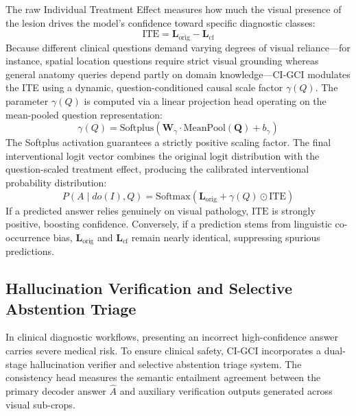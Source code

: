\documentclass[journal]{IEEEtran}
\begin{document}
The raw Individual Treatment Effect measures how much the visual presence of the lesion drives the model's confidence toward specific diagnostic classes:
\begin{equation}
\text{ITE} = \mathbf{L}_{\text{orig}} - \mathbf{L}_{\text{cf}}
\end{equation}
Because different clinical questions demand varying degrees of visual reliance---for instance, spatial location questions require strict visual grounding whereas general anatomy queries depend partly on domain knowledge---CI-GCI modulates the ITE using a dynamic, question-conditioned causal scale factor $\gamma(Q)$. The parameter $\gamma(Q)$ is computed via a linear projection head operating on the mean-pooled question representation:
\begin{equation}
\gamma(Q) = \text{Softplus}\left(\mathbf{W}_{\gamma} \cdot \text{MeanPool}(\mathbf{Q}) + b_{\gamma}\right)
\end{equation}
The Softplus activation guarantees a strictly positive scaling factor. The final interventional logit vector combines the original logit distribution with the question-scaled treatment effect, producing the calibrated interventional probability distribution:
\begin{equation}
P(A \mid do(I), Q) = \text{Softmax}\left(\mathbf{L}_{\text{orig}} + \gamma(Q) \odot \text{ITE}\right)
\end{equation}
If a predicted answer relies genuinely on visual pathology, $\text{ITE}$ is strongly positive, boosting confidence. Conversely, if a prediction stems from linguistic co-occurrence bias, $\mathbf{L}_{\text{orig}}$ and $\mathbf{L}_{\text{cf}}$ remain nearly identical, suppressing spurious predictions.

\subsection{Hallucination Verification and Selective Abstention Triage}
In clinical diagnostic workflows, presenting an incorrect high-confidence answer carries severe medical risk. To ensure clinical safety, CI-GCI incorporates a dual-stage hallucination verifier and selective abstention triage system. The consistency head measures the semantic entailment agreement between the primary decoder answer $\hat{A}$ and auxiliary verification outputs generated across visual sub-crops.
\end{document}
